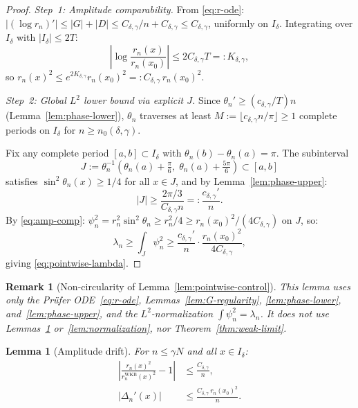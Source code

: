 \documentclass[12pt,a4paper]{amsart}
\newtheorem{lemma}[theorem]{Lemma}
\newtheorem{remark}[theorem]{Remark}
\newcommand{\psin}{\psi_n}
\begin{document}
\begin{proof}
\textit{Step~1: Amplitude comparability.}
From \eqref{eq:r-ode}:
$|(\log r_n)'| \le |G| + |D|
\le C_{\delta,\gamma}/n + C_{\delta,\gamma}
\le C_{\delta,\gamma}$,
uniformly on $I_\delta$.
Integrating over $I_\delta$ with $|I_\delta| \le 2T$:
\[
  \left|\log\frac{r_n(x)}{r_n(x_0)}\right|
  \le 2C_{\delta,\gamma}T
  =: K_{\delta,\gamma},
\]
so $r_n(x)^2 \le e^{2K_{\delta,\gamma}}r_n(x_0)^2
=: C_{\delta,\gamma}\,r_n(x_0)^2$.

\textit{Step~2: Global $L^2$ lower bound via explicit $J$.}
Since $\theta_n' \ge (c_{\delta,\gamma}/T)n$
(Lemma~\ref{lem:phase-lower}),
$\theta_n$ traverses at least
$M := \lfloor c_{\delta,\gamma}n/\pi\rfloor \ge 1$
complete periods on $I_\delta$ for $n \ge n_0(\delta,\gamma)$.

Fix any complete period $[a,b] \subset I_\delta$
with $\theta_n(b) - \theta_n(a) = \pi$.
The subinterval
\[
  J := \theta_n^{-1}\!\left(
         \theta_n(a) + \tfrac{\pi}{6},\;
         \theta_n(a) + \tfrac{5\pi}{6}
       \right) \subset [a,b]
\]
satisfies $\sin^2\theta_n(x) \ge 1/4$ for all $x \in J$,
and by Lemma~\ref{lem:phase-upper}:
\[
  |J| \ge \frac{2\pi/3}{C_{\delta,\gamma}n}
      =: \frac{c_{\delta,\gamma}'}{n}.
\]
By \eqref{eq:amp-comp}:
$\psin^2 = r_n^2\sin^2\theta_n
\ge r_n^2/4 \ge r_n(x_0)^2/(4C_{\delta,\gamma})$
on $J$, so:
\[
  \lambda_n
  \ge \int_J\psin^2
  \ge \frac{c_{\delta,\gamma}'}{n}
     \cdot\frac{r_n(x_0)^2}{4C_{\delta,\gamma}},
\]
giving \eqref{eq:pointwise-lambda}.
\end{proof}

\begin{remark}[Non-circularity of Lemma~\ref{lem:pointwise-control}]
This lemma uses only the Pr\"ufer ODE~\eqref{eq:r-ode},
Lemmas~\ref{lem:G-regularity}, \ref{lem:phase-lower},
and~\ref{lem:phase-upper},
and the $L^2$-normalization $\int\psin^2 = \lambda_n$.
It does not use Lemmas~\ref{lem:amplitude-drift}
or~\ref{lem:normalization},
nor Theorem~\ref{thm:weak-limit}.
\end{remark}

\begin{lemma}[Amplitude drift]\label{lem:amplitude-drift}
For $n \le \gamma N$ and all $x \in I_\delta$:
\begin{align}
  \left|\frac{r_n(x)^2}{r_n^{\mathrm{WKB}}(x)^2} - 1\right|
  &\le \frac{C_{\delta,\gamma}}{n},
  \label{eq:amp-ratio}\\
  \left|\Delta_n'(x)\right|
  &\le \frac{C_{\delta,\gamma}\,r_n(x_0)^2}{n}.
  \label{eq:amp-dev-deriv}
\end{align}
\end{lemma}
\end{document}
